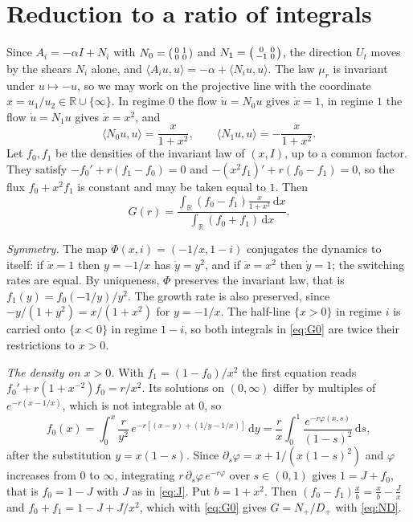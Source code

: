 \documentclass[11pt]{amsart}
\theoremstyle{remark}
\numberwithin{equation}{section}
\newcommand{\dd}{\,\mathrm{d}}
\begin{document}
\section{Reduction to a ratio of integrals}\label{sec:reduction}

Since $A_i=-\alpha I+N_i$ with $N_0=\begin{psmallmatrix}0&1\\0&0\end{psmallmatrix}$ and $N_1=\begin{psmallmatrix}0&0\\-1&0\end{psmallmatrix}$, the direction $U_t$ moves by the shears $N_i$ alone, and $\langle A_iu,u\rangle=-\alpha+\langle N_iu,u\rangle$. The law $\mu_r$ is invariant under $u\mapsto-u$, so we may work on the projective line with the coordinate $x=u_1/u_2\in\mathbb R\cup\{\infty\}$. In regime $0$ the flow $\dot u=N_0u$ gives $\dot x=1$, in regime $1$ the flow $\dot u=N_1u$ gives $\dot x=x^2$, and
\[
\langle N_0u,u\rangle=\frac{x}{1+x^2},\qquad \langle N_1u,u\rangle=-\frac{x}{1+x^2}.
\]
Let $f_0,f_1$ be the densities of the invariant law of $(x,I)$, up to a common factor. They satisfy $-f_0'+r(f_1-f_0)=0$ and $-(x^2f_1)'+r(f_0-f_1)=0$, so the flux $f_0+x^2f_1$ is constant and may be taken equal to $1$. Then
\begin{equation}\label{eq:G0}
G(r)=\frac{\int_{\mathbb R}(f_0-f_1)\frac{x}{1+x^2}\dd x}{\int_{\mathbb R}(f_0+f_1)\dd x}.
\end{equation}

\emph{Symmetry.} The map $\Phi(x,i)=(-1/x,1-i)$ conjugates the dynamics to itself: if $\dot x=1$ then $y=-1/x$ has $\dot y=y^2$, and if $\dot x=x^2$ then $\dot y=1$; the switching rates are equal. By uniqueness, $\Phi$ preserves the invariant law, that is $f_1(y)=f_0(-1/y)/y^2$. The growth rate is also preserved, since $-y/(1+y^2)=x/(1+x^2)$ for $y=-1/x$. The half-line $\{x>0\}$ in regime $i$ is carried onto $\{x<0\}$ in regime $1-i$, so both integrals in \eqref{eq:G0} are twice their restrictions to $x>0$.

\emph{The density on $x>0$.} With $f_1=(1-f_0)/x^2$ the first equation reads $f_0'+r(1+x^{-2})f_0=r/x^2$. Its solutions on $(0,\infty)$ differ by multiples of $e^{-r(x-1/x)}$, which is not integrable at $0$, so
\[
f_0(x)=\int_0^x\frac r{y^2}\,e^{-r[(x-y)+(1/y-1/x)]}\dd y=\frac rx\int_0^1\frac{e^{-r\varphi(x,s)}}{(1-s)^2}\dd s,
\]
after the substitution $y=x(1-s)$. Since $\partial_s\varphi=x+1/(x(1-s)^2)$ and $\varphi$ increases from $0$ to $\infty$, integrating $r\,\partial_s\varphi\,e^{-r\varphi}$ over $s\in(0,1)$ gives $1=J+f_0$, that is $f_0=1-J$ with $J$ as in \eqref{eq:J}. Put $b=1+x^2$. Then $(f_0-f_1)\frac x{b}=\frac xb-\frac Jx$ and $f_0+f_1=1-J+J/x^2$, which with \eqref{eq:G0} gives $G=N_+/D_+$ with \eqref{eq:ND}.
\end{document}
